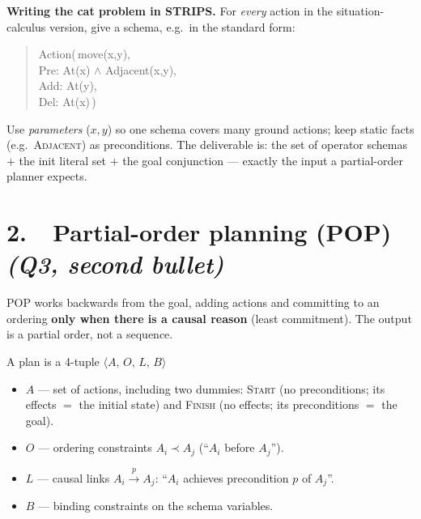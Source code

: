 \documentclass[11pt,a4paper]{article}
\newcommand{\pred}[1]{\textsc{#1}}
\begin{document}
\textbf{Writing the cat problem in STRIPS.} For \emph{every} action in the situation-calculus version, give a schema, e.g.\ in the standard form:
\begin{quote}\ttfamily
Action(\,move(x,y),\\
\hspace*{1em}Pre:  At(x) $\wedge$ Adjacent(x,y),\\
\hspace*{1em}Add:  At(y),\\
\hspace*{1em}Del:  At(x)\,)
\end{quote}
Use \emph{parameters} ($x,y$) so one schema covers many ground actions; keep static facts (e.g.\ \pred{Adjacent}) as preconditions. The deliverable is: the set of operator schemas $+$ the init literal set $+$ the goal conjunction --- exactly the input a partial-order planner expects.

\section*{2.\ \ Partial-order planning (POP) \hfill {\normalfont\itshape (Q3, second bullet)}}

POP works backwards from the goal, adding actions and committing to an ordering \textbf{only when there is a causal reason} (least commitment). The output is a partial order, not a sequence.

\begin{defbox}{A plan is a 4-tuple $\langle A,\,O,\,L,\,B\rangle$}
\begin{itemize}[leftmargin=*,itemsep=1pt]
  \item $A$ --- set of actions, including two dummies:
        \pred{Start} (no preconditions; its effects $=$ the initial state) and
        \pred{Finish} (no effects; its preconditions $=$ the goal).
  \item $O$ --- ordering constraints $A_i \prec A_j$ (``$A_i$ before $A_j$'').
  \item $L$ --- causal links $A_i \xrightarrow{\,p\,} A_j$: ``$A_i$ achieves precondition $p$ of $A_j$''.
  \item $B$ --- binding constraints on the schema variables.
\end{itemize}
\end{defbox}
\end{document}
